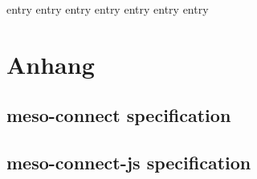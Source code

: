 \documentclass[headsepline,footsepline,footinclude=false,oneside,fontsize=11pt,paper=a4,listof=totoc,bibliography=totoc]{scrbook} %
\begin{document}
\renewcommand*\abstractname{Zusammenfassung/Abstract}



\frontmatter{}




\tableofcontents{}

\mainmatter{}

{entry}
{entry}
{entry}
{entry}
{entry}
{entry}
{entry}

\appendix{}

\todos{}
\listoffigures{}
\printbibliography{}

\chapter{Anhang}

\section{meso-connect specification}
\label{app:meso-connect}




\section{meso-connect-js specification}
\label{app:meso-connect-js}

\end{document}

